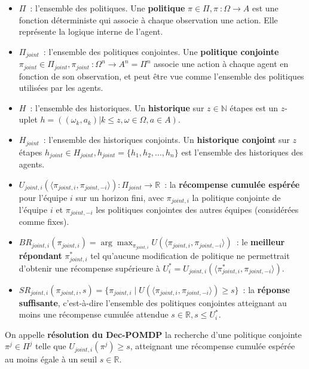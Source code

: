 \documentclass[francais,ROIA,Unicode,manuscript]{cedram}
\begin{document}
\begin{itemize}
    \item $\Pi$~: l'ensemble des politiques. Une \textbf{politique} $\pi \in \Pi, \pi~: \Omega \rightarrow A$ est une fonction déterministe qui associe à chaque observation une action. Elle représente la logique interne de l'agent.
    \item $\Pi_{joint}$~: l'ensemble des politiques conjointes. Une \textbf{politique conjointe} $\pi_{joint} \in \Pi_{joint}, \pi_{joint}~: \Omega^n \rightarrow A^n = \Pi^n$ associe une action à chaque agent en fonction de son observation, et peut être vue comme l'ensemble des politiques utilisées par les agents.
    \item $H$~: l'ensemble des historiques. Un \textbf{historique} sur $z \in \mathbb{N}$ étapes est un $z$-uplet $h = ((\omega_k, a_k) | k \leq z, \omega \in \Omega, a \in A)$.
    \item $H_{joint}$~: l'ensemble des historiques conjoints. Un \textbf{historique conjoint} sur $z$ étapes $h_{joint} \in H_{joint}, h_{joint} = \{h_1, h_2, ..., h_n\}$ est l'ensemble des historiques des agents.
    \item $U_{joint,i}(\langle \pi_{joint,i}, \pi_{joint,-i} \rangle): \Pi_{joint} \rightarrow \mathbb{R}$~: la \textbf{récompense cumulée espérée} pour l'équipe $i$ sur un horizon fini, avec $\pi_{joint,i}$ la politique conjointe de l'équipe $i$ et $\pi_{joint,-i}$ les politiques conjointes des autres équipes (considérées comme fixes).
    \item $BR_{joint,i}(\pi_{joint,i}) = \arg\max_{\pi_{joint,i}} U(\langle \pi_{joint,i}, \pi_{joint,-i} \rangle)$~: le \textbf{meilleur répondant} $\pi^*_{joint,i}$ tel qu'aucune modification de politique ne permettrait d'obtenir une récompense supérieure à $U^*_i = U_{joint,i}(\langle \pi^*_{joint,i}, \pi_{joint,-i} \rangle)$.
    \item $SR_{joint,i}(\pi_{joint,i}, s) = \{\pi_{joint,i} \mid U(\langle \pi_{joint,i}, \pi_{joint,-i} \rangle) \geq s\}$~: la \textbf{réponse suffisante}, c'est-à-dire l'ensemble des politiques conjointes atteignant au moins une récompense cumulée attendue $s \in \mathbb{R}, s \leq U^*_i$.
\end{itemize}

On appelle \textbf{résolution du Dec-POMDP} la recherche d'une politique conjointe $\pi^j \in \Pi^j$ telle que $U_{joint,i}(\pi^j) \geq s$, atteignant une récompense cumulée espérée au moins égale à un seuil $s \in \mathbb{R}$.
\end{document}

